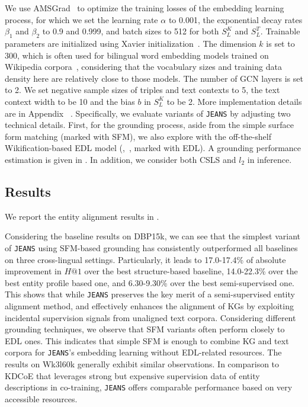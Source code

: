 \documentclass[11pt,a4paper]{article}
\makeatletter
\newcommand{\stitle}[1]{\vspace{2ex} \noindent{\bf #1}}
\newcommand{\modelname}[0]{\texttt{JEANS}\xspace}
\def\hitsone{\mathit{H}\mbox{@}1}
\makeatother
\begin{document}
\stitle{Model Configurations.}
We use AMSGrad~\citep{reddi2018convergence} to optimize the training losses of the embedding learning process, for which we set the learning rate $\alpha$ to 0.001, the exponential decay rates $\beta_1$ and $\beta_2$ to 0.9 and 0.999, and batch sizes to 512 for both $S^K_L$ and $S^T_L$.
Trainable parameters are initialized using Xavier initialization~\cite{glorot2010understanding}.
The dimension $k$ is set to 300, which is often used for bilingual word embedding models trained on Wikipedia corpora~\cite{conneau2018word,gouws2015bilbowa}, considering that the vocabulary sizes and training data density here are relatively close to those models.
The number of GCN layers is set to 2.
We set negative sample sizes of triples and text contexts to 5, the text context width to be 10 and the bias $b$ in $S^K_L$ to be 2.
More implementation details are in Appendix ~\cite{chen2021cross}.
Specifically, we evaluate variants of \modelname by adjusting two technical details.
First, for the grounding process, aside from the simple surface form matching (marked with SFM), we also explore with the off-the-shelf Wikification-based EDL model (\citeauthor{upadhyay2018joint},~\citeyear{upadhyay2018joint}, marked with EDL).
A grounding performance estimation is given in .
In addition, we consider both CSLS and $l_2$ in inference.



\subsection{Results}
We report the entity alignment results in .


Considering the baseline results on DBP15k, we can see that the simplest variant of \modelname using SFM-based grounding has consistently outperformed all baselines on three cross-lingual settings.
Particularly, it leads to 17.0-17.4\% of absolute improvement in $\hitsone$ over the best structure-based baseline, 14.0-22.3\% over the best entity profile based one, and 6.30-9.30\% over the best semi-supervised one.
This shows that while \modelname preserves the key merit of a semi-supervised entity alignment method,
and effectively enhances the alignment of KGs by exploiting incidental supervision signals from unaligned text corpora.
Considering different grounding techniques, we observe that SFM variants often perform closely to EDL ones.
This indicates that simple SFM is enough to combine KG and text corpora for \modelname's embedding learning without EDL-related resources.
The results on Wk3l60k generally exhibit similar observations. 
In comparison to KDCoE that leverages strong but expensive supervision data of entity descriptions in co-training, \modelname  offers comparable performance based on very accessible resources.
\end{document}
